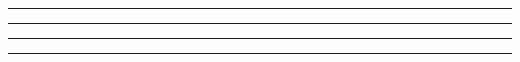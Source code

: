 \begin{problem}{14.8}

\end{problem}

\begin{solution}


\end{solution}

\noindent\rule{7in}{1.5pt}


\begin{problem}{14.9}

\end{problem}

\begin{solution}


\end{solution}

\noindent\rule{7in}{1.5pt}


\begin{problem}{14.10}

\end{problem}

\begin{solution}


\end{solution}

\noindent\rule{7in}{1.5pt}


\begin{problem}{14.11}

\end{problem}

\begin{solution}


\end{solution}

\noindent\rule{7in}{1.5pt}


\begin{problem}{14.12}

\end{problem}

